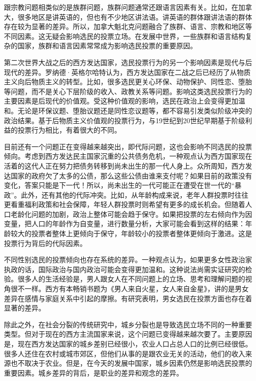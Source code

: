 跟宗教问题相类似的是族群问题，族群问题通常还跟语言因素有关。比如，在加拿大，很多地区是讲英语的，但也有不少地区讲法语。讲英语的群体跟讲法语的群体存在较为显著的差异。所以，加拿大魁北克问题融合了族群、语言、宗教和地区等不同因素。这无疑会影响选民的投票立场。在发展中世界，一些族群和语言结构复杂的国家，族群和语言因素常常成为影响选民投票的重要原因。

第二次世界大战之后的西方发达国家，选民投票行为的另一个影响因素是现代与后现代的差异。罗纳德·英格尔哈特认为，西方发达国家在二战之后已经历了从物质主义向后物质主义的转型。比如，很多选民更关心环保、动物保护、同性恋、堕胎等问题，而不是关心下层阶级的收入、政教关系等问题。影响这类选民投票行为的主要因素是后现代的价值观。受这种价值观的影响，选民在政治上会变得更加温和。无论是环保议题、堕胎议题还是同性恋议题等，都不容易引发类似阶级冲突的政治结果。基于后物质主义价值观的投票行为，与19世纪到20世纪早期基于阶级利益的投票行为相比，有着很大的不同。

目前还有一个问题正在变得越来越突出，即代际问题，这也会影响不同选民的投票倾向。考虑到西方发达民主国家沉重的公共债务危机，一种观点认为西方国家现在活着的这代人正在努力把债务转移到尚未出生的那一代人身上。众所周知，西方发达国家的政府欠了太多的公债，那么这些公债由谁来支付呢？如果目前的政策没有变化，答案只能是下一代！所以，尚未出生的一代可能正在遭受在世一代的“暴政”。此外，还有其他的代际冲突。比如，从年龄构成来说，老年人群投票时往往更看重福利政策和社会保障，年轻人群投票时则希望有更多的成长机会。但随着人口老龄化问题的加剧，政治上整体可能会趋于保守。如果把投票的左右倾向作为因变量，把人口的年龄作为自变量，进行数量分析，大家可能会看到这样的结果：年龄较大的投票者整体上更倾向于保守，年龄较小的投票者整体更倾向于激进。这是投票行为背后的代际因素。

不同性别选民的投票倾向也存在系统的差异。一种观点认为，如果更多女性政治家执政的话，国际政治与国内政治可能会变得更加温和。这种说法尚需实证研究的检验。很多人的生活经验是，男人跟女人在不同问题上的立场、思考和理解问题的视角很不一样。西方有本畅销书题为《男人来自火星，女人来自金星》，讲的是男女差异在感情与家庭关系中引起的摩擦。有研究表明，男女选民在投票方面也存在着显著的差异。

除此之外，在社会分裂的传统研究中，城乡分裂也是导致选民立场不同的一种重要类型。但对于现在的西方主流国家来说，这个问题已变得越来越次要了。主要原因是，现在西方发达国家的城乡差别已经很小，农业人口占总人口的比例已经很低。很多人还住在农村或城市郊区，但他们从事的是跟农业无关的活动，他们的收入来源也不取决于农业。但是，在今天的发展中国家，城乡因素仍然是影响选民投票的重要因素。城乡差异的背后，是职业的差异和观念的差异。

